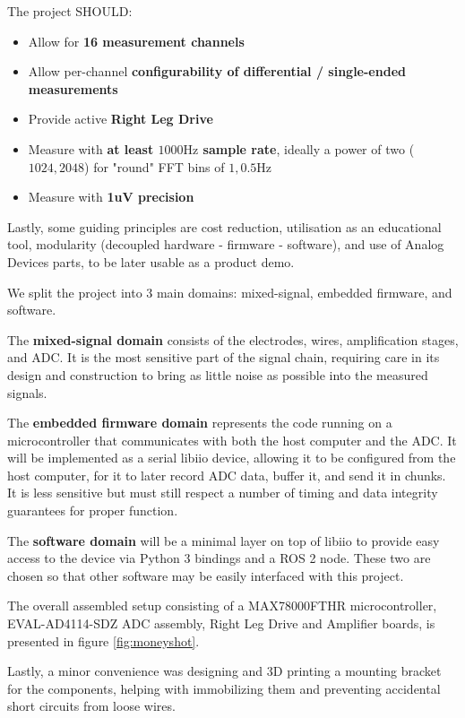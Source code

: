 \documentclass{thesis}
\newcommand{\Hz}{\unit{\hertz}}
\begin{document}
The project SHOULD:

\begin{itemize}
    \item Allow for \textbf{16 measurement channels}
    \item Allow per-channel \textbf{configurability of differential / single-ended measurements}
    \item Provide active \textbf{Right Leg Drive}
    \item Measure with \textbf{at least $1000\Hz$ sample rate}, ideally a power of two ($1024, 2048$) for "round" FFT bins of $1, 0.5\Hz$
    \item Measure with \textbf{1uV precision}
\end{itemize}

Lastly, some guiding principles are cost reduction, utilisation as an educational tool, modularity (decoupled hardware - firmware - software), and use of Analog Devices parts, to be later usable as a product demo.

We split the project into 3 main domains: mixed-signal, embedded firmware, and software.

The \textbf{mixed-signal domain} consists of the electrodes, wires, amplification stages, and ADC. It is the most sensitive part of the signal chain, requiring care in its design and construction to bring as little noise as possible into the measured signals.

The \textbf{embedded firmware domain} represents the code running on a microcontroller that communicates with both the host computer and the ADC. It will be implemented as a serial libiio device, allowing it to be configured from the host computer, for it to later record ADC data, buffer it, and send it in chunks. It is less sensitive but must still respect a number of timing and data integrity guarantees for proper function.

The \textbf{software domain} will be a minimal layer on top of libiio to provide easy access to the device via Python 3 bindings and a ROS 2 node. These two are chosen so that other software may be easily interfaced with this project.

The overall assembled setup consisting of a MAX78000FTHR microcontroller, EVAL-AD4114-SDZ ADC assembly, Right Leg Drive and Amplifier boards, is presented in figure \ref{fig:moneyshot}.

Lastly, a minor convenience was designing and 3D printing a mounting bracket for the components, helping with immobilizing them and preventing accidental short circuits from loose wires.
\end{document}
